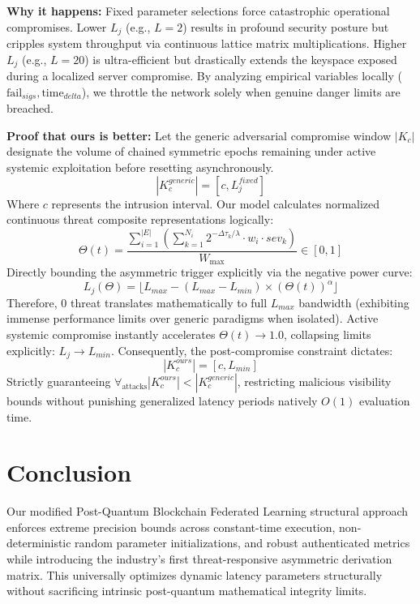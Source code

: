 \documentclass[12pt]{article}
\begin{document}
\textbf{Why it happens:} Fixed parameter selections force catastrophic operational compromises. Lower $L_j$ (e.g., $L = 2$) results in profound security posture but cripples system throughput via continuous lattice matrix multiplications. Higher $L_j$ (e.g., $L=20$) is ultra-efficient but drastically extends the keyspace exposed during a localized server compromise. By analyzing empirical variables locally ($\text{fail}_{sigs}, \text{time}_{delta}$), we throttle the network solely when genuine danger limits are breached.

\textbf{Proof that ours is better:} 
Let the generic adversarial compromise window $|K_c|$ designate the volume of chained symmetric epochs remaining under active systemic exploitation before resetting asynchronously.
\[
|K_{c}^{generic}| = [c, L_j^{fixed}]
\]
Where $c$ represents the intrusion interval.
Our model calculates normalized continuous threat composite representations logically:
\[
\Theta(t) = \frac{\sum_{i=1}^{|E|} \left( \sum_{k=1}^{N_i} 2^{-\Delta \tau_k / \lambda} \cdot w_i \cdot sev_{k} \right)}{W_{\max}} \in [0, 1]
\]
Directly bounding the asymmetric trigger explicitly via the negative power curve:
\[
L_j(\Theta) = \lfloor L_{max} - (L_{max} - L_{min}) \times (\Theta(t))^{\alpha} \rfloor
\]
Therefore, $0$ threat translates mathematically to full $L_{max}$ bandwidth (exhibiting immense performance limits over generic paradigms when isolated). Active systemic compromise instantly accelerates $\Theta(t) \to 1.0$, collapsing limits explicitly: $L_j \to L_{min}$. 
Consequently, the post-compromise constraint dictates:
\[
|K_{c}^{ours}| = [c, L_{min}] 
\]
Strictly guaranteeing $\forall_{\text{attacks}} |K_{c}^{ours}| < |K_{c}^{generic}|$, restricting malicious visibility bounds without punishing generalized latency periods natively $O(1)$ evaluation time.

\section*{Conclusion}
Our modified Post-Quantum Blockchain Federated Learning structural approach enforces extreme precision bounds across constant-time execution, non-deterministic random parameter initializations, and robust authenticated metrics while introducing the industry's first threat-responsive asymmetric derivation matrix. This universally optimizes dynamic latency parameters structurally without sacrificing intrinsic post-quantum mathematical integrity limits.
\end{document}
